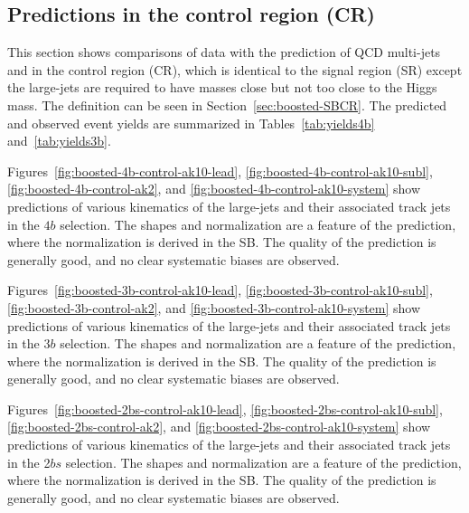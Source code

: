 \clearpage


\subsection{Predictions in the control region (CR)}
\label{sec:boosted-cr}

This section shows comparisons of data with the prediction of QCD multi-jets and \ttbar in the control region (CR), which is identical to the signal region (SR) except the large-\R jets are required to have masses close but not too close to the Higgs mass. The definition can be seen in Section~\ref{sec:boosted-SBCR}. The predicted and observed event yields are summarized in Tables~\ref{tab:yields4b} and~\ref{tab:yields3b}.

Figures~\ref{fig:boosted-4b-control-ak10-lead}, \ref{fig:boosted-4b-control-ak10-subl}, \ref{fig:boosted-4b-control-ak2}, and \ref{fig:boosted-4b-control-ak10-system} show predictions of various kinematics of the large-\R jets and their associated track jets in the $4b$ selection. The shapes and normalization are a feature of the prediction, where the normalization is derived in the SB. The quality of the prediction is generally good, and no clear systematic biases are observed.

Figures~\ref{fig:boosted-3b-control-ak10-lead}, \ref{fig:boosted-3b-control-ak10-subl}, \ref{fig:boosted-3b-control-ak2},  and \ref{fig:boosted-3b-control-ak10-system} show predictions of various kinematics of the large-\R jets and their associated track jets in the $3b$ selection. The shapes and normalization are a feature of the prediction, where the normalization is derived in the SB. The quality of the prediction is generally good, and no clear systematic biases are observed.

Figures~\ref{fig:boosted-2bs-control-ak10-lead}, \ref{fig:boosted-2bs-control-ak10-subl}, \ref{fig:boosted-2bs-control-ak2},  and \ref{fig:boosted-2bs-control-ak10-system} show predictions of various kinematics of the large-\R jets and their associated track jets in the 2$bs$ selection. The shapes and normalization are a feature of the prediction, where the normalization is derived in the SB. The quality of the prediction is generally good, and no clear systematic biases are observed.

